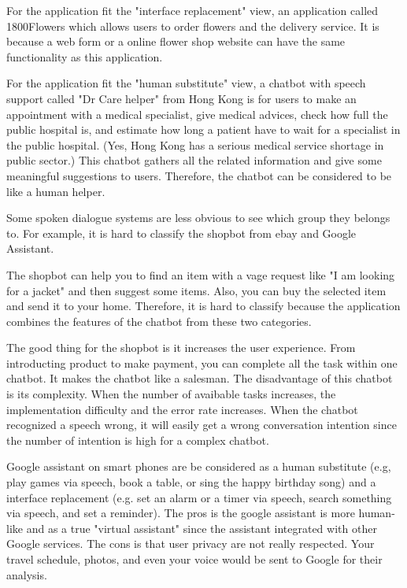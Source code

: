 \documentclass[12pt]{article}
\newenvironment{problem}[2][Problem]{\begin{trivlist}
\item[\hskip \labelsep {\bfseries #1}\hskip \labelsep {\bfseries #2.}]}{\end{trivlist}}
\begin{document}
\begin{problem}{3.2}
    For the application fit the "interface replacement" view, an application called 
    1800Flowers which allows users to order flowers and the delivery service.
    It is because a web form or a online flower shop website can have 
    the same functionality as this application.

    For the application fit the "human substitute" view, a chatbot with speech 
    support called "Dr Care helper" from Hong Kong is for users to make an 
    appointment with a medical
    specialist, give medical advices, check how full the public hospital is, and 
    estimate how long a patient have to wait for a specialist in the public hospital.
    (Yes, Hong Kong has a serious medical service shortage in public sector.)
    This chatbot gathers all the related information and give some meaningful
    suggestions to users. Therefore, the chatbot can be considered to be like a
    human helper.

    Some spoken dialogue systems are less obvious to see which group they belongs
    to. For example, it is hard to classify the shopbot from ebay and Google
    Assistant.
    
    The shopbot can help you to find an item with a vage request like 
    "I am looking for a jacket" and then suggest some items. Also, you can buy
    the selected item and send it to your home. Therefore, it is hard to classify 
    because the application combines the features of the chatbot from these 
    two categories.

    The good thing for the shopbot is it increases the user experience. From 
    introducting product to make payment, you can complete all the task within 
    one chatbot. It makes the chatbot like a salesman. The disadvantage of this
    chatbot is its complexity. When the number of avaibable tasks increases, 
    the implementation difficulty and the error rate increases. When the chatbot
    recognized a speech wrong, it will easily get a wrong conversation intention
    since the number of intention is high for a complex chatbot.

    Google assistant on smart phones are be considered as a human substitute (e.g,
    play games via speech, book a table, or sing the happy birthday song)
    and a interface replacement (e.g.
    set an alarm or a timer via speech, search something via speech, and set a 
    reminder). The pros is
    the google assistant is more human-like and as a true "virtual assistant" since
    the assistant integrated with other Google services. The cons is that 
    user privacy are not really respected.
    Your travel schedule, photos, and even your voice would be sent to 
    Google for their analysis.
\end{problem}
\end{document}
